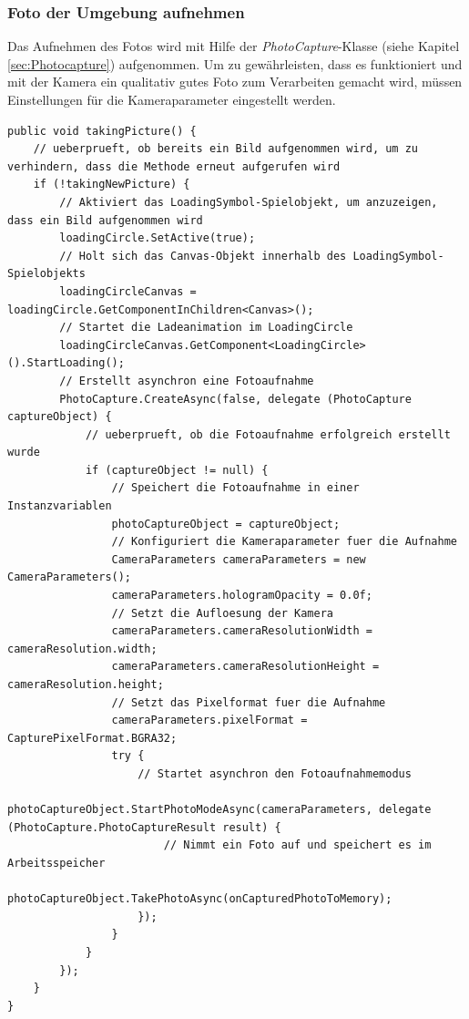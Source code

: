 \subsubsection{Foto der Umgebung aufnehmen}
Das Aufnehmen des Fotos wird mit Hilfe der \textit{PhotoCapture}-Klasse (siehe Kapitel \ref{sec:Photocapture}) aufgenommen. Um zu gewährleisten, dass es funktioniert und mit der Kamera ein qualitativ gutes Foto zum Verarbeiten gemacht wird, müssen Einstellungen für die Kameraparameter eingestellt werden.
\begin{lstlisting}[style=csharp, caption={Bild einstellung und aufnahme}, label=code:takingPicture]
public void takingPicture() {
    // ueberprueft, ob bereits ein Bild aufgenommen wird, um zu verhindern, dass die Methode erneut aufgerufen wird
    if (!takingNewPicture) {
        // Aktiviert das LoadingSymbol-Spielobjekt, um anzuzeigen, dass ein Bild aufgenommen wird
        loadingCircle.SetActive(true);
        // Holt sich das Canvas-Objekt innerhalb des LoadingSymbol-Spielobjekts
        loadingCircleCanvas = loadingCircle.GetComponentInChildren<Canvas>();
        // Startet die Ladeanimation im LoadingCircle
        loadingCircleCanvas.GetComponent<LoadingCircle>().StartLoading();
        // Erstellt asynchron eine Fotoaufnahme
        PhotoCapture.CreateAsync(false, delegate (PhotoCapture captureObject) {
            // ueberprueft, ob die Fotoaufnahme erfolgreich erstellt wurde
            if (captureObject != null) {
                // Speichert die Fotoaufnahme in einer Instanzvariablen
                photoCaptureObject = captureObject;
                // Konfiguriert die Kameraparameter fuer die Aufnahme
                CameraParameters cameraParameters = new CameraParameters();
                cameraParameters.hologramOpacity = 0.0f;
                // Setzt die Aufloesung der Kamera
                cameraParameters.cameraResolutionWidth = cameraResolution.width;
                cameraParameters.cameraResolutionHeight = cameraResolution.height;
                // Setzt das Pixelformat fuer die Aufnahme
                cameraParameters.pixelFormat = CapturePixelFormat.BGRA32;
                try {
                    // Startet asynchron den Fotoaufnahmemodus
                    photoCaptureObject.StartPhotoModeAsync(cameraParameters, delegate (PhotoCapture.PhotoCaptureResult result) {
                        // Nimmt ein Foto auf und speichert es im Arbeitsspeicher
                        photoCaptureObject.TakePhotoAsync(onCapturedPhotoToMemory);
                    });
                }
            }
        });
    }
}
\end{lstlisting}

